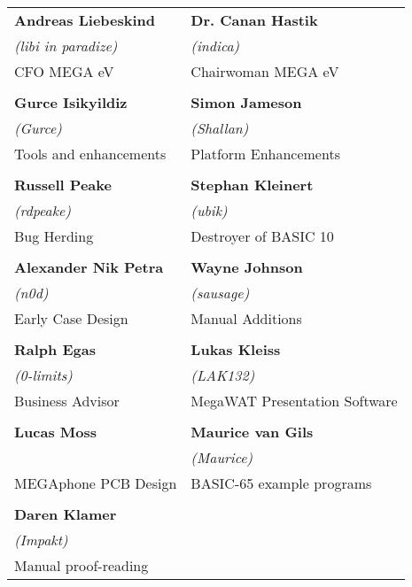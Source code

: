 \setlength{\tabcolsep}{1mm}
\begin{tabular}{p{6cm}p{6cm}}

{\large\bf Andreas Liebeskind}     & {\large\bf Dr. Canan Hastik} \\
 \textit{(libi in paradize)}       & \textit{(indica)} \\
CFO MEGA eV                        & Chairwoman MEGA eV \\
& \\
{\large\bf Gurce Isikyildiz}       & {\large\bf Simon Jameson} \\
 \textit{(Gurce)}                  &  \textit{(Shallan)} \\
Tools and enhancements             & Platform Enhancements \\
& \\
{\large\bf Russell Peake}          & {\large\bf Stephan Kleinert} \\
  \textit{(rdpeake)}               & \textit{(ubik)}        \\
Bug Herding                        & Destroyer of BASIC 10     \\
& \\
{\large\bf Alexander Nik Petra}    & {\large\bf Wayne Johnson} \\
 \textit{(n0d)}                    &  \textit{(sausage)} \\
Early Case Design                  & Manual Additions \\
& \\
{\large\bf Ralph Egas}             & {\large\bf Lukas Kleiss} \\
 \textit{(0-limits)}               & \textit{(LAK132)} \\
Business Advisor                   & MegaWAT Presentation Software \\
& \\
{\large\bf Lucas Moss}             & {\large\bf Maurice van Gils }  \\
                                   & \textit{(Maurice)}  \\
MEGAphone PCB Design               & BASIC-65 example programs \\
& \\
{\large\bf Daren Klamer}           & \\
 \textit{(Impakt)}                 & \\
Manual proof-reading               & \\
\end{tabular}

